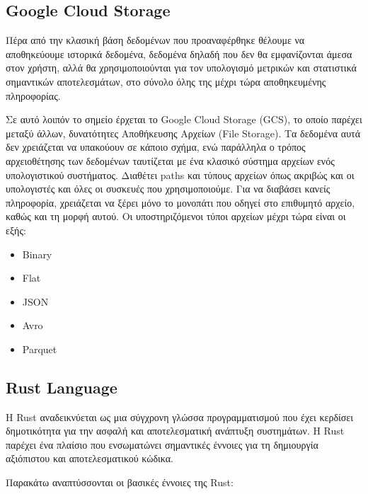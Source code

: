 \vfill
\break

\subsection{Google Cloud Storage}
\label{subsec:gcloud}

Πέρα από την κλασική βάση δεδομένων που προαναφέρθηκε θέλουμε να αποθηκεύουμε ιστορικά δεδομένα,
δεδομένα δηλαδή που δεν θα εμφανίζονται άμεσα στον χρήστη, αλλά θα χρησιμοποιούνται για τον υπολογισμό μετρικών και στατιστικά σημαντικών αποτελεσμάτων,
στο σύνολο όλης της μέχρι τώρα αποθηκευμένης πληροφορίας.

Σε αυτό λοιπόν το σημείο έρχεται το Google Cloud Storage (GCS), το οποίο παρέχει μεταξύ άλλων, δυνατότητες
Αποθήκευσης Αρχείων (File Storage). Τα δεδομένα αυτά δεν χρειάζεται να υπακούουν σε κάποιο σχήμα,
ενώ παράλληλα ο τρόπος αρχειοθέτησης των δεδομένων ταυτίζεται με ένα κλασικό σύστημα αρχείων
ενός υπολογιστικού συστήματος. Διαθέτει paths και τύπους αρχείων όπως ακριβώς και οι υπολογιστές και όλες οι
συσκευές που χρησιμοποιούμε. Για να διαβάσει κανείς πληροφορία, χρειάζεται να ξέρει μόνο το μονοπάτι που οδηγεί
στο επιθυμητό αρχείο, καθώς και τη μορφή αυτού. Οι υποστηριζόμενοι τύποι αρχείων μέχρι τώρα είναι οι εξής:

\begin{itemize}
	\item Binary
	\item Flat
	\item JSON
	\item Avro
	\item Parquet
\end{itemize}

\subsection{Rust Language}
\label{subsec:rust}
Η Rust αναδεικνύεται ως μια σύγχρονη γλώσσα προγραμματισμού που έχει κερδίσει δημοτικότητα για την ασφαλή και αποτελεσματική ανάπτυξη συστημάτων. Η Rust παρέχει ένα πλαίσιο που ενσωματώνει σημαντικές έννοιες για τη δημιουργία αξιόπιστου και αποτελεσματικού κώδικα.

Παρακάτω αναπτύσσονται οι βασικές έννοιες της Rust:

